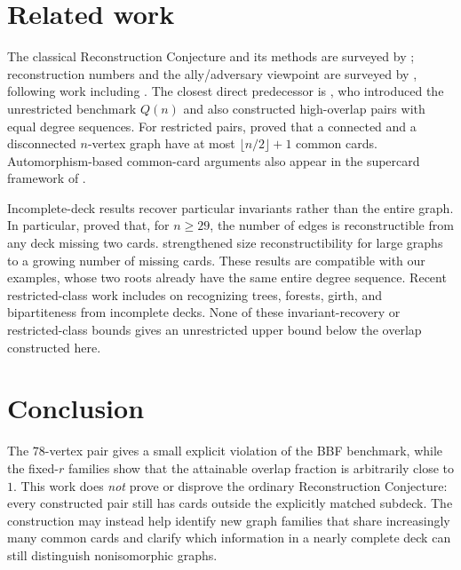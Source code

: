 \documentclass[11pt]{article}
\begin{document}
\section{Related work}\label{sec:related}
The classical Reconstruction Conjecture and its methods are surveyed by \citet{BH77}; reconstruction
numbers and the ally/adversary viewpoint are surveyed by \citet{AFLM10}, following work including
\citet{Myrvold88}. The closest direct predecessor is \citet{BBF10}, who introduced the unrestricted
benchmark $Q(n)$ and also constructed high-overlap pairs with equal degree sequences. For restricted
pairs, \citet{BBFM11} proved that a connected and a disconnected $n$-vertex graph have at most
$\lfloor n/2\rfloor+1$ common cards. Automorphism-based common-card arguments also appear in the
supercard framework of \citet{BF18super}.

Incomplete-deck results recover particular invariants rather than the entire graph. In particular,
\citet{BF18size} proved that, for $n\ge29$, the number of edges is reconstructible from any deck missing
two cards. \citet{GGS21} strengthened size reconstructibility for large graphs to a growing number of
missing cards. These results are compatible with our examples, whose two roots already have the same
entire degree sequence. Recent restricted-class work includes \citet{Zwaneveld23} on recognizing trees,
forests, girth, and bipartiteness from incomplete decks. None of these invariant-recovery or
restricted-class bounds gives an unrestricted upper bound below the overlap constructed here.

\section{Conclusion}\label{sec:conclusion}
The $78$-vertex pair gives a small explicit violation of the BBF benchmark, while the fixed-$r$ families
show that the attainable overlap fraction is arbitrarily close to $1$. This work does \emph{not} prove or
disprove the ordinary Reconstruction Conjecture: every constructed pair still has cards outside the
explicitly matched subdeck. The construction may instead help identify new graph families that share
increasingly many common cards and clarify which information in a nearly complete deck can still
distinguish nonisomorphic graphs.
\end{document}
